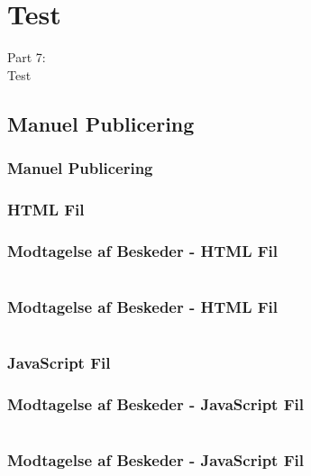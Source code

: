 \section{Test}
\begin{frame}
    \vspace{25mm}
    \begin{center}
        \Huge{Part 7:\\Test}
    \end{center}
\end{frame}

\subsection{Manuel Publicering}
\begin{frame}
    \frametitle{Manuel Publicering}
\end{frame}
\subsubsection{HTML Fil}
\begin{frame}
    \frametitle{Modtagelse af Beskeder - HTML Fil}
    \vspace{-2mm}
    \inputminted[fontsize=\footnotesize,breaklines=true,highlightlines={}]{html}{../src/frontend/part7_publish/index.html}
\end{frame}
\begin{frame}
    \frametitle{Modtagelse af Beskeder - HTML Fil}
    \vspace{-2mm}
    \inputminted[fontsize=\footnotesize,breaklines=true,highlightlines={9,11,12}]{html}{../src/frontend/part7_publish/index.html}
\end{frame}

\subsubsection{JavaScript Fil}
\begin{frame}
    \frametitle{Modtagelse af Beskeder - JavaScript Fil}
    \vspace{-1mm}
    \inputminted[fontsize=\normalsize,highlightlines={}]{javascript}{../src/frontend/part7_publish/logic.js}
\end{frame}
\begin{frame}
    \frametitle{Modtagelse af Beskeder - JavaScript Fil}
    \vspace{-1mm}
    \inputminted[fontsize=\normalsize,highlightlines={3,4}]{javascript}{../src/frontend/part7_publish/logic.js}
\end{frame}

